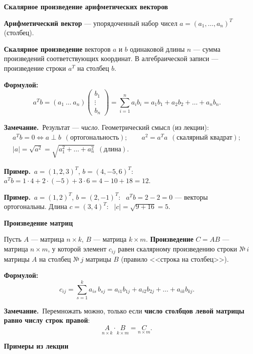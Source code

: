 \documentclass[a4paper,11pt]{article}
\newcommand{\fm}{\par\noindent\textbf{\textcolor{oprc!85!black}{Формулой:}}}
\newcommand{\prim}{\par\smallskip\noindent\textbf{\textcolor{teoc!80!black}{Пример.}}\ }
\newcommand{\zam}{\par\smallskip\noindent\textbf{\textcolor{zamc}{Замечание.}}\ }
\newcommand{\podr}[1]{\par\needspace{8\baselineskip}\medskip
  {\large\bfseries\textcolor{oprc!80!black}{#1}}\par\nopagebreak\smallskip}
\begin{document}
\podr{Скалярное произведение арифметических векторов}

\textbf{Арифметический вектор} --- упорядоченный набор чисел $a = (a_1, \dots, a_n)^T$ (столбец).

\begin{opr}
\textbf{Скалярное произведение} векторов $a$ и $b$ одинаковой длины $n$ --- сумма произведений соответствующих координат.
В алгебраической записи --- произведение строки $a^T$ на столбец $b$.
\fm
\[
  a^T b = (a_1\ \dots\ a_n) \begin{pmatrix} b_1 \\ \vdots \\ b_n \end{pmatrix} = \sum_{i=1}^{n} a_i b_i = a_1 b_1 + a_2 b_2 + \dots + a_n b_n.
\]
\end{opr}

\zam Результат --- \emph{число}. Геометрический смысл (из лекции):
\begin{gather*}
  a^T b = 0 \Leftrightarrow a \perp b \ \ (\text{ортогональность}); \qquad
  a^2 = a^T a \ \ (\text{скалярный квадрат}); \\
  |a| = \sqrt{a^2} = \sqrt{a_1^2 + \dots + a_n^2} \ \ (\text{длина}).
\end{gather*}

\prim $a = (1, 2, 3)^T$, $b = (4, -5, 6)^T$: \ $a^T b = 1 \cdot 4 + 2 \cdot (-5) + 3 \cdot 6 = 4 - 10 + 18 = 12$.

\prim $a = (1, 2)^T$, $b = (2, -1)^T$: \ $a^T b = 2 - 2 = 0$ --- векторы ортогональны.
Длина $c = (3, 4)^T$: \ $|c| = \sqrt{9 + 16} = 5$.

\podr{Произведение матриц}

\begin{opr}
Пусть $A$ --- матрица $n \times k$, $B$ --- матрица $k \times m$. \textbf{Произведение} $C = AB$ --- матрица $n \times m$,
у которой элемент $c_{ij}$ равен скалярному произведению строки $\text{№}\,i$ матрицы $A$ на столбец $\text{№}\,j$ матрицы $B$
(правило <<строка на столбец>>).
\fm
\[
  c_{ij} = \sum_{s=1}^{k} a_{is}\, b_{sj} = a_{i1} b_{1j} + a_{i2} b_{2j} + \dots + a_{ik} b_{kj}.
\]
\end{opr}

\zam Перемножать можно, только если \textbf{число столбцов левой матрицы равно числу строк правой}:
\[
  \underset{n \times \boxed{k}}{A} \cdot \underset{\boxed{k} \times m}{B} = \underset{n \times m}{C}.
\]

\podr{Примеры из лекции}
\end{document}
